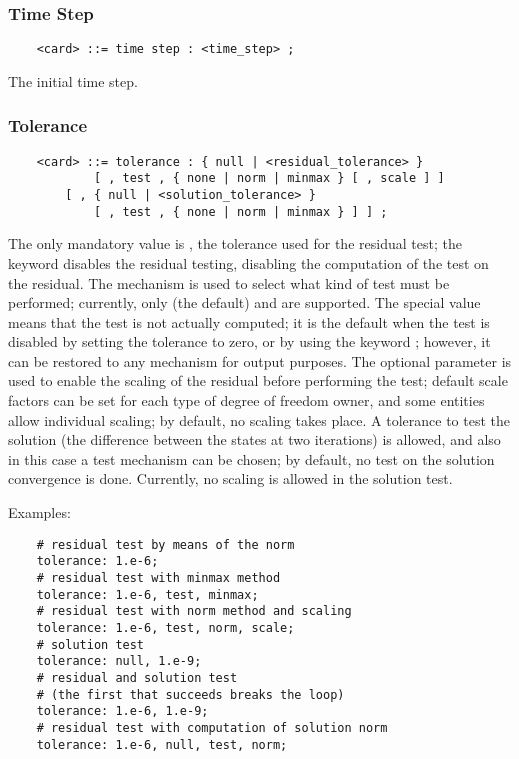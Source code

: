 \subsubsection{Time Step}
\begin{verbatim}
    <card> ::= time step : <time_step> ;
\end{verbatim}
The initial time step.

\subsubsection{Tolerance}
\begin{verbatim}
    <card> ::= tolerance : { null | <residual_tolerance> }
            [ , test , { none | norm | minmax } [ , scale ] ]
        [ , { null | <solution_tolerance> } 
            [ , test , { none | norm | minmax } ] ] ;
\end{verbatim}
The only mandatory value is , 
the tolerance used for the residual test; the keyword 
disables the residual testing, disabling the computation
of the test on the residual.
The  mechanism is used to select what kind of test must
be performed; currently, only  (the default) 
and  are supported.
The special value  means that the test is not actually 
computed; it is the default when the test is disabled by setting
the tolerance to zero, or by using the keyword ;
however, it can be restored to any mechanism for output purposes.
The optional parameter  is used to enable the scaling
of the residual before performing the test; default scale factors 
can be set for each type of degree of freedom owner, and some
entities allow individual scaling; by default, no scaling takes place.
A tolerance  to test the solution 
(the difference between the states at two iterations) is allowed, 
and also in this case a test mechanism can be chosen;
by default, no test on the solution convergence is done.
Currently, no scaling is allowed in the solution test.

\noindent
Examples:
\begin{verbatim}
    # residual test by means of the norm
    tolerance: 1.e-6;
    # residual test with minmax method
    tolerance: 1.e-6, test, minmax;
    # residual test with norm method and scaling
    tolerance: 1.e-6, test, norm, scale;
    # solution test
    tolerance: null, 1.e-9;
    # residual and solution test
    # (the first that succeeds breaks the loop)
    tolerance: 1.e-6, 1.e-9;
    # residual test with computation of solution norm
    tolerance: 1.e-6, null, test, norm;
\end{verbatim}

